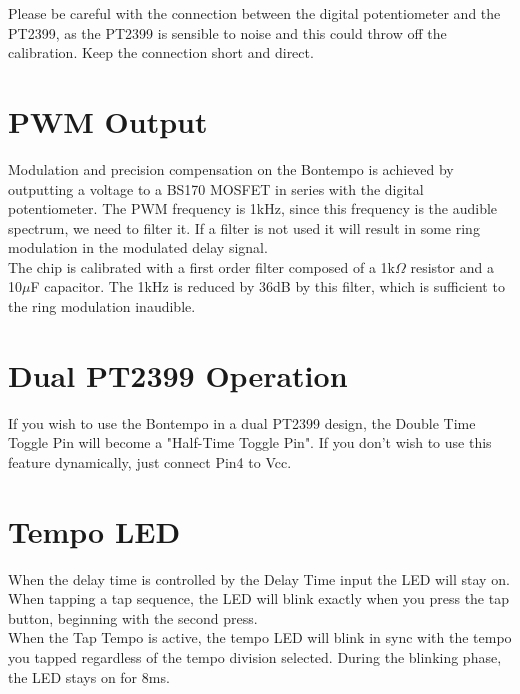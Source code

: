 \documentclass[a4paper, 10pt]{article}
\begin{document}
Please be careful with the connection between the digital potentiometer and the PT2399, as the PT2399 is sensible to noise and this could throw off the calibration. Keep the connection short and direct.\\

\section{PWM Output}
\bigbreak
Modulation and precision compensation on the Bontempo is achieved by outputting a voltage to a BS170 MOSFET in series with the digital potentiometer. The PWM frequency is 1kHz, since this frequency is the audible spectrum, we need to filter it. If a filter is not used it will result in some ring modulation in the modulated delay signal.\\

The chip is calibrated with a first order filter composed of a 1k$\Omega$ resistor and a 10$\mu$F capacitor. The 1kHz is reduced by 36dB by this filter, which is sufficient to the ring modulation inaudible.\\

\section{Dual PT2399 Operation}
\label{sec:dualpt}
\bigbreak
If you wish to use the Bontempo in a dual PT2399 design, the Double Time Toggle Pin will become a "Half-Time Toggle Pin". If you don't wish to use this feature dynamically, just connect Pin4 to Vcc. \\


\section{Tempo LED}
\bigbreak
When the delay time is controlled by the Delay Time input the LED will stay on.\\

When tapping a tap sequence, the LED will blink exactly when you press the tap button, beginning with the second press.\\

When the Tap Tempo is active, the tempo LED will blink in sync with the tempo you tapped regardless of the tempo division selected. During the blinking phase, the LED stays on for 8ms.\\
\end{document}
